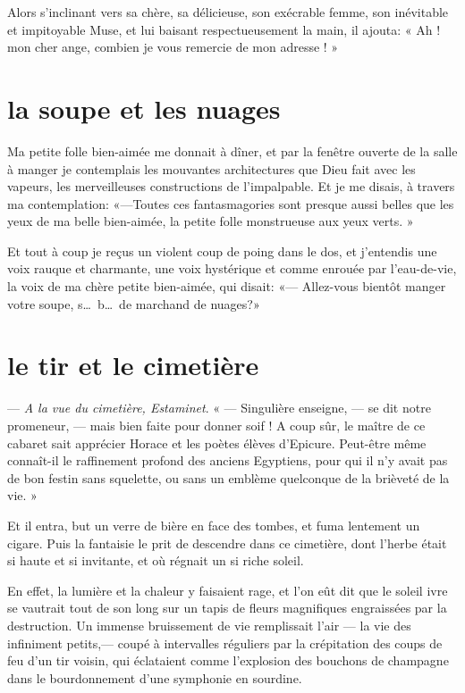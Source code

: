 Alors s’inclinant vers sa chère, sa délicieuse, son
exécrable femme, son inévitable et impitoyable Muse, et lui baisant
respectueusement la main, il ajouta: « Ah ! mon cher ange, combien je
vous remercie de mon adresse ! »


\quebra\section[La soupe et les nuages]{la soupe et les nuages}

Ma petite folle bien{}-aimée me donnait à dîner, et par la fenêtre
ouverte de la salle à manger je contemplais les mouvantes architectures
que Dieu fait avec les vapeurs, les merveilleuses constructions de
l’impalpable. Et je me disais, à travers ma
contemplation: «---Toutes ces fantasmagories sont presque aussi belles
que les yeux de ma belle bien{}-aimée, la petite folle monstrueuse aux
yeux verts. »

Et tout à coup je reçus un violent coup de poing dans le dos, et
j’entendis une voix rauque et charmante, une voix
hystérique et comme enrouée par l’eau{}-de{}-vie, la
voix de ma chère petite bien{}-aimée, qui disait: «--- Allez{}-vous
bientôt manger votre soupe, s\ldots\ b\ldots\ de marchand de nuages?»

\quebra\section[Le tir et le cimetière]{le tir et le cimetière}

--- \textit{A la vue du cimetière, Estaminet}. « --- Singulière enseigne, --- se dit
notre promeneur, --- mais bien faite pour donner soif ! A coup sûr, le
maître de ce cabaret sait apprécier Horace et les poètes élèves
d’Epicure. Peut{}-être même connaît{}-il le
raffinement profond des anciens Egyptiens, pour qui il
n’y avait pas de bon festin sans squelette, ou sans un
emblème quelconque de la brièveté de la vie. »

Et il entra, but un verre de bière en face des tombes, et fuma lentement
un cigare. Puis la fantaisie le prit de descendre dans ce cimetière,
dont l’herbe était si haute et si invitante, et où
régnait un si riche soleil.

En effet, la lumière et la chaleur y faisaient rage, et
l’on eût dit que le soleil ivre se vautrait tout de
son long sur un tapis de fleurs magnifiques engraissées par la
destruction. Un immense bruissement de vie remplissait
l’air --- la vie des infiniment petits,--- coupé à
intervalles réguliers par la crépitation des coups de feu
d’un tir voisin, qui éclataient comme
l’explosion des bouchons de champagne dans le
bourdonnement d’une symphonie en sourdine.

